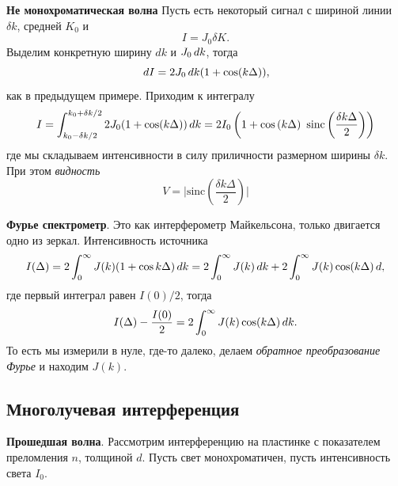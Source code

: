 \textbf{Не монохроматическая волна}
Пусть есть некоторый сигнал с шириной линии $\delta k$, средней $K_0$ и
\begin{equation*}
    I = J_0 \delta K.
\end{equation*}
Выделим конкретную ширину $d k$ и $J_0 \, d k$, тогда
\begin{equation*}
    \, d I =2 J_0 \, d k (1 + \cos (k \Delta)),
\end{equation*}
как в предыдущем примере. Приходим к интегралу
\begin{equation*}
    I = \int_{k_0-\delta k/2}^{k_0 + \delta k /2} 
    2 J_0 (1 + \cos(k \Delta)) \, d k = 
    2 I_0 \left(1 + \cos\left( k \Delta\right) \ \text{sinc} \left(\frac{\delta k \Delta}{2}\right)\right)
\end{equation*}
где мы складываем интенсивности в силу приличности размерном ширины $\delta k$.
При этом \textit{видность}
\begin{equation*}
    V = \bigg| \text{sinc} \left(
        \frac{\delta k \Delta}{2}
    \right)
    \bigg|
\end{equation*}

\textbf{Фурье спектрометр}. Это как интерферометр Майкельсона, только двигается одно из зеркал. Интенсивность источника
\begin{equation*}
    I(\Delta) = 
    2 \int_0^\infty
    J(k) (1 + \cos k \Delta) \, d k = 
    2 \int_0^{\infty} J(k) \, d k + 
    2 \int_0^\infty 
    J(k) \cos (k \Delta) \, d,
\end{equation*}
где первый интеграл равен $I(0)/2$, тогда
\begin{equation*}
    I(\Delta) - \frac{I(0)}{2} = 2 \int_0^{\infty} J(k) \cos (k \Delta) \, d k.
\end{equation*}
То есть мы измерили в нуле, где-то далеко, делаем \textit{обратное преобразование Фурье} и находим $J(k)$.


\subsection{Многолучевая интерференция}


\textbf{Прошедшая волна}. Рассмотрим интерференцию на пластинке с показателем преломления $n$, толщиной $d$. Пусть свет монохроматичен,
пусть интенсивность света $I_0$.


